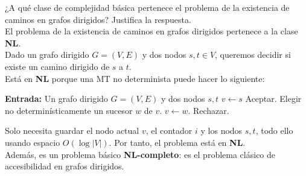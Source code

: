 \documentclass[12pt]{article}
\begin{document}
    \begin{ejercicio}[1.3 puntos]
        ¿A qué clase de complejidad básica pertenece el problema de la existencia de caminos en grafos dirigidos? Justifica la respuesta. \\

        El problema de la existencia de caminos en grafos dirigidos pertenece a la clase \textbf{NL}. \\

        Dado un grafo dirigido $G=(V,E)$ y dos nodos $s,t\in V$, queremos decidir si existe un camino dirigido de $s$ a $t$. \\

        Está en \textbf{NL} porque una MT no determinista puede hacer lo siguiente:
        \begin{algorithm}
        \caption{MTND para accesibilidad en grafos dirigidos}
        \begin{algorithmic}
        \State \textbf{Entrada:} Un grafo dirigido $G=(V,E)$ y dos nodos $s,t$
        \State $v\gets s$
                \State Aceptar.
            \EndIf
            \State Elegir no determinísticamente un sucesor $w$ de $v$.
            \State $v\gets w$.
        \EndFor
        \State Rechazar.
        \end{algorithmic}
        \end{algorithm}

        Solo necesita guardar el nodo actual $v$, el contador $i$ y los nodos $s,t$, todo ello usando espacio $O(\log |V|)$. 
        Por tanto, el problema está en \textbf{NL}. \\

        Además, es un problema básico \textbf{NL-completo}: es el problema clásico de accesibilidad en grafos dirigidos.
    \end{ejercicio}

    \newpage
\end{document}

